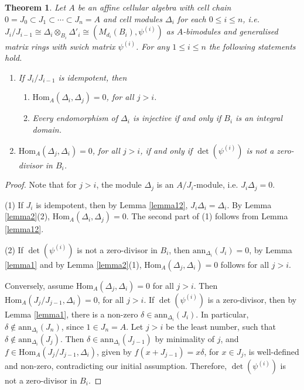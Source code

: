 \documentclass[oneside, a4paper, 11pt]{amsart}
\newtheorem{theorem}{Theorem}
\newcommand{\Hom}{\mathrm{Hom}}
\newcommand{\Ann}{\mathrm{ann}}
\begin{document}
\begin{theorem}\label{determinante}
Let $A$ be an affine cellular algebra with cell chain $0=J_0 \subset J_1 \subset \cdots \subset J_n=A$ and cell modules $\Delta_i$ for each $0\leq i\leq n$, i.e. 
$J_i/J_{i-1} \cong \Delta_i \otimes_{B_i}  \Delta'_i \cong \left( M_{d_i}(B_i), \psi^{(i)} \right)$ as $A$-bimodules and 
generalised matrix rings with swich matrix $\psi^{(i)}$.
For any $1\leq i \leq n$ the following statements hold.
\begin{enumerate}
    \item If $J_i/J_{i-1}$ is idempotent, then 
    \begin{enumerate}
        \item $\Hom_A(\Delta_i, \Delta_j)=0$, for all $j>i$.
        \item Every endomorphism of $\Delta_i$ is injective if and only if $B_i$ is an integral domain.
    \end{enumerate}
    \item $\Hom_A(\Delta_j,\Delta_i)=0$, for all $j>i$, if and only if $\det(\psi^{(i)})$ is not a zero-divisor in $B_i$.
\end{enumerate}
\end{theorem}

\begin{proof}
Note that for $j>i$, the module $\Delta_j$ is an $A/J_i$-module, i.e. $J_i\Delta_j = 0$.

(1) If $J_i$ is idempotent, then by Lemma \ref{lemma12}, $J_i\Delta_i=\Delta_i$. By Lemma \ref{lemma2}(2),  $\Hom_A(\Delta_i,\Delta_j)=0$. The second part of (1)  follows from Lemma \ref{lemma12}.

(2) If $\det(\psi^{(i)})$ is not a zero-divisor in $B_i$, then $\Ann_{\Delta_i}(J_i)=0$, by Lemma \ref{lemma1} and by Lemma \ref{lemma2}(1), $\Hom_A(\Delta_j,\Delta_i)=0$ follows for all $j>i$.

Conversely, assume $\Hom_A(\Delta_j,\Delta_i)=0$ for all $j>i$.
Then $\Hom_A(J_j/J_{j-1},\Delta_i)=0$, for all $j>i$. 
If $\det(\psi^{(i)})$ is a zero-divisor, then by Lemma \ref{lemma1}, there is a non-zero $\delta\in \Ann_{\Delta_i}(J_i)$. In particular, $\delta \not\in \Ann_{\Delta_i}(J_n)$, since $1\in J_n=A$. Let $j>i$ be the least number, such that $\delta \not\in \Ann_{\Delta_i}(J_j)$. Then $\delta\in\Ann_{\Delta_i}(J_{j-1})$ by minimality of $j$, and $f\in \Hom_A(J_j/J_{j-1},\Delta_i)$, given by $f(x+J_{j-1})=x\delta$, for $x\in J_j$, is well-defined and non-zero, contradicting our initial assumption. Therefore, $\det(\psi^{(i)})$ is not a zero-divisor in $B_i$.
\end{proof}
\end{document}
